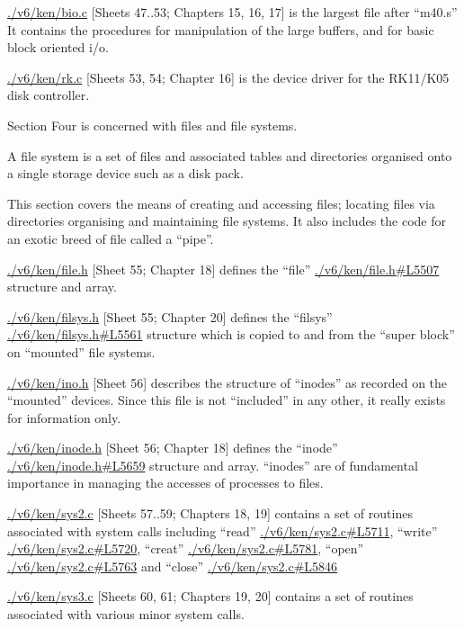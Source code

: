 \item[bio.c] \url{./v6/ken/bio.c} [Sheets 47..53; Chapters 15,
16, 17] is the largest file after
``m40.s'' It contains the procedures
for manipulation of the large
buffers, and for basic block
oriented i/o.

\item[rk.c] \url{./v6/ken/rk.c} [Sheets 53, 54; Chapter 16] is
the device driver for the RK11/K05
disk controller.
\ed



Section Four is concerned with files
and file systems.

A file system is a set of files and
associated tables and directories
organised onto a single storage device
such as a disk pack.


This section covers the means of
creating and accessing files;
locating files via directories
organising and maintaining
file systems.
It also includes the code for an exotic
breed of file called a ``pipe''.


\bd
\item[file.h] \url{./v6/ken/file.h} [Sheet 55; Chapter 18]
defines the ``file'' \url{./v6/ken/file.h#L5507} structure and
array.

\item[filsys.h] \url{./v6/ken/filsys.h} [Sheet 55; Chapter 20]
defines the ``filsys'' \url{./v6/ken/filsys.h#L5561} structure which
is copied to and from the ``super
block'' on ``mounted'' file systems.


\item[ino.h] \url{./v6/ken/ino.h} [Sheet 56] describes the
structure of ``inodes'' as recorded on
the ``mounted'' devices. Since this
file is not ``included'' in any other,
it really exists for information
only.


\item[inode.h] \url{./v6/ken/inode.h} [Sheet 56; Chapter 18]
defines the ``inode'' \url{./v6/ken/inode.h#L5659} structure and
array. ``inodes'' are of fundamental
importance in managing the accesses
of processes to files.

\item[sys2.c] \url{./v6/ken/sys2.c} [Sheets 57..59; Chapters 18,
19] contains a set of routines associated
with system calls including
``read'' \url{./v6/ken/sys2.c#L5711}, ``write'' \url{./v6/ken/sys2.c#L5720}, ``creat'' \url{./v6/ken/sys2.c#L5781}, ``open'' \url{./v6/ken/sys2.c#L5763} and
``close'' \url{./v6/ken/sys2.c#L5846}
 
\item[sys3.c] \url{./v6/ken/sys3.c} [Sheets 60, 61; Chapters 19, 20]
contains a set of routines associated
with various minor system
calls.
 
